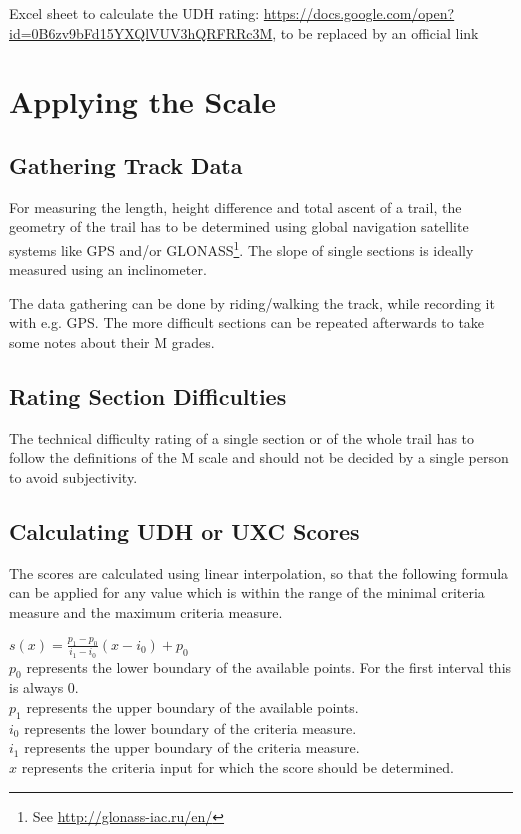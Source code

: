 \documentclass[a4paper,oneside]{scrartcl}
\begin{document}
Excel sheet to calculate the UDH rating: \url{https://docs.google.com/open?id=0B6zv9bFd15YXQlVUV3hQRFRRc3M}, to be replaced by an official link


\section{Applying the Scale}

\subsection{Gathering Track Data}
For measuring the length, height difference and total ascent of a trail, the
geometry of the trail has to be determined using global navigation satellite
systems like GPS and/or GLONASS\footnote{See \url{http://glonass-iac.ru/en/}}.
The slope of single sections is ideally measured using an inclinometer.

The data gathering can be done by riding/walking the track, while recording it
with e.g. GPS. The more difficult sections can be repeated afterwards to take
some notes about their M grades.

\subsection{Rating Section Difficulties}
The technical difficulty rating of a single section or of the whole trail has to
follow the definitions of the M scale and should not be decided by a single
person to avoid subjectivity.


\subsection{Calculating UDH or UXC Scores}
The scores are calculated using linear interpolation, so that the following formula can be applied for any value which is
within the range of the minimal criteria measure and the maximum criteria measure.

$s(x) = \frac{p_1 - p_0}{i_1 - i_0} (x - i_0) + p_0$\\
%
$p_0$ represents the lower boundary of the available points. For the first interval this is always 0.\\
$p_1$ represents the upper boundary of the available points.\\
$i_0$ represents the lower boundary of the criteria measure.\\
$i_1$ represents the upper boundary of the criteria measure.\\
$x$ represents the criteria input for which the score should be determined.\\
\end{document}
